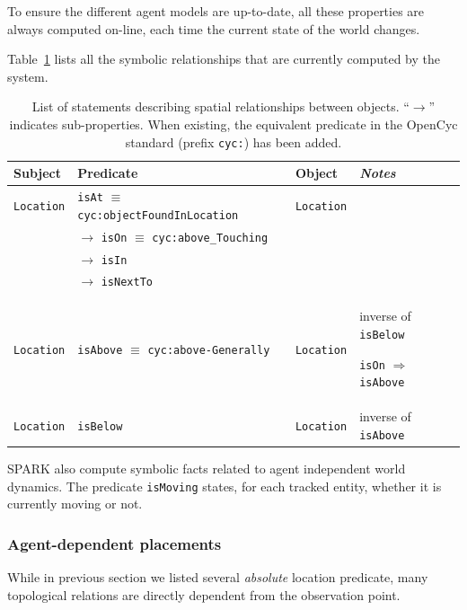 \documentclass{svmult}
\newcommand{\concept}[1]{{\footnotesize \texttt{#1}}}
\begin{document}
To ensure the different agent models are up-to-date, all these properties are
always computed on-line, each time the current state of the world changes.

Table~\ref{facts|sprelations} lists all the symbolic relationships that are
currently computed by the system.

\begin{table}[h]
    \centering
    \begin{tabular}{p{1.5cm}p{5cm}p{2cm}p{4cm}}
	\rowcolor{white}
    \textbf{Subject} & \textbf{Predicate} & \textbf{Object} & \emph{Notes} \\ 
    \hline
	 \concept{Location} & \concept{isAt} $\equiv$ \concept{cyc:objectFoundInLocation}  &  \concept{Location} & \\ 
	 &  $\rightarrow$ \concept{isOn} $\equiv$ \concept{cyc:above\_Touching}  &  & \\ 
	 &  $\rightarrow$ \concept{isIn}  &  & \\ 
	 &  $\rightarrow$ \concept{isNextTo}  & &  \\ 
	 \concept{Location}  & \concept{isAbove} $\equiv$ \concept{cyc:above-Generally}  &  \concept{Location}  &  inverse of \concept{isBelow} \par \concept{isOn} $\Rightarrow$ \concept{isAbove}\\ 
	 \concept{Location}  & \concept{isBelow}  & \concept{Location}  &  inverse of \concept{isAbove}
	\end{tabular}

	\caption{List of statements describing spatial relationships between
	objects. ``$\rightarrow$'' indicates sub-properties. When existing, the
	equivalent predicate in the {\sc OpenCyc} standard (prefix \concept{cyc:})
	has been added.}

\label{facts|sprelations}
\end{table}

SPARK also compute symbolic facts related to agent independent world dynamics.
The predicate \concept{isMoving} states, for each tracked entity, whether it is
currently moving or not.


\subsubsection{Agent-dependent placements}

While in previous section we listed several \emph{absolute} location predicate,
many topological relations are directly dependent from the observation point.
\end{document}
